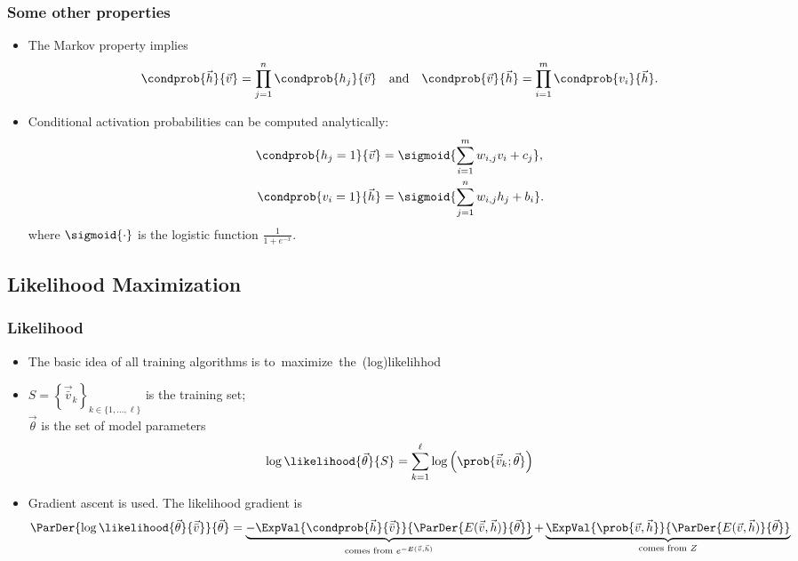\begin{frame}
  \frametitle{Some other properties}
  \begin{itemize}
    \item<1-> The Markov property implies
      \[
        \condprob{\vec{h}}{\vec{v}} = \prod_{j=1}^n \condprob{h_j}{\vec{v}} \quad\text{and}\quad
        \condprob{\vec{v}}{\vec{h}} = \prod_{i=1}^m \condprob{v_i}{\vec{h}}.
      \]
    \item<2-> Conditional activation probabilities can be computed analytically:
      \begin{align*}
        \condprob{h_j=1}{\vec{v}} &= \sigmoid{\sum_{i=1}^m w_{i,j}v_i+c_j},\\
        \condprob{v_i=1}{\vec{h}} &= \sigmoid{\sum_{j=1}^n w_{i,j}h_j+b_i}.
      \end{align*}
      where \(\sigmoid{\cdot}\) is the \alert{logistic function} \(\frac{1}{1+e^{-x}}\).
  \end{itemize}
\end{frame}


\subsection{Likelihood Maximization}
\begin{frame}
\frametitle{Likelihood}
  \begin{itemize}
		\item The basic idea of all training algorithms is \alert{to~maximize~the~(log)likelihhod}
		\item \(S = \left\{\vec{\bar{v}}_k\right\}_{k \in \{1,\dots,\ell\}}\) is the training set;\\
      \(\vec{\theta}\) is the set of model parameters
		  \[
			 \log\likelihood{\vec{\theta}}{S} = \sum_{k=1}^\ell \log\left(\prob{\vec{\bar{v}}_k;\vec{\theta}}\right)
		  \]
		\pause
    \item \alert{Gradient ascent} is used. The likelihood gradient is
      \[
         \ParDer{\log\likelihood{\vec{\theta}}{\vec{\bar{v}}}}{\vec{\theta}} =
         	\underbrace{-\ExpVal{\condprob{\vec{h}}{\vec{\bar{v}}}}{\ParDer{E(\vec{\bar{v}},\vec{h})}{\vec{\theta}}}}_{\text{comes from } e^{-E(\vec{\bar{v}},\vec{h})}}
          +\underbrace{\ExpVal{\prob{\vec{v},\vec{h}}}{\ParDer{E(\vec{v},\vec{h})}{\vec{\theta}}}}_{\text{comes from } Z}
      \]
	\end{itemize}
\end{frame}

